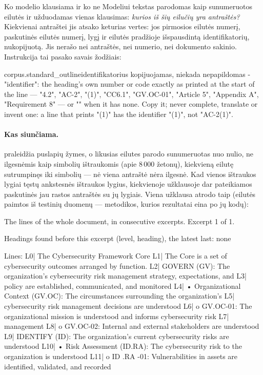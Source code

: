 \begin{aibox}{Ko modelio klausiama ir ko ne}
Modeliui tekstas parodomas kaip sunumeruotos eilutės ir užduodamas vienas klausimas:
\emph{kurios iš šių eilučių yra antraštės?} Kiekvienai antraštei jis atsako keturias vertes:
jos pirmosios eilutės numerį, paskutinės eilutės numerį, lygį ir eilutės pradžioje
išspausdintą identifikatorių, nukopijuotą. Jis nerašo nei antraštės, nei numerio, nei dokumento
sakinio. Instrukcija tai pasako savais žodžiais:
\begin{promptexcerpt}{corpus.standard_outline}{identifikatorius kopijuojamas, niekada nepapildomas}
- "identifier": the heading's own number or code exactly as printed at the
  start of the line — "4.2", "AC-2", "(1)", "CC6.1", "GV.OC-01", "Article 5",
  "Appendix A", "Requirement 8" — or "" when it has none. Copy it; never
  complete, translate or invent one: a line that prints "(1)" has the
  identifier "(1)", not "AC-2(1)".
\end{promptexcerpt}
\end{aibox}

\paragraph{Kas siunčiama.}  praleidžia puslapių žymes, o likusias eilutes
parodo sunumeruotas nuo nulio, ne ilgesnėmis kaip  simbolių
ištraukomis (apie 8\,000 žetonų), kiekvieną eilutę sutrumpinęs iki 
simbolių --- nė viena antraštė nėra ilgesnė. Kad vienos ištraukos lygiai tęstų ankstesnės
ištraukos lygius, kiekvienoje užklausoje dar pateikiamos paskutinės 
jau rastos antraštės su jų lygiais. Viena užklausa atrodo taip (eilutės paimtos iš
 testinių duomenų --- metodikos, kurios rezultatai eina po
jų kodų):

\begin{codeblock}
The lines of the whole document, in consecutive excerpts. Excerpt 1 of 1.

Headings found before this excerpt (level, heading), the latest last:
none

Lines:
L0| The Cybersecurity Framework Core
L1| The Core is a set of cybersecurity outcomes arranged by function.
L2| GOVERN (GV): The organization’s cybersecurity risk management strategy, expectations, and
L3| policy are established, communicated, and monitored
L4| • Organizational Context (GV.OC): The circumstances surrounding the organization’s
L5| cybersecurity risk management decisions are understood
L6| o GV.OC-01: The organizational mission is understood and informs cybersecurity risk
L7| management
L8| o GV.OC-02: Internal and external stakeholders are understood
L9| IDENTIFY (ID): The organization’s current cybersecurity risks are understood
L10| • Risk Assessment (ID.RA): The cybersecurity risk to the organization is understood
L11| o ID .RA -01: Vulnerabilities in assets are identified, validated, and recorded
\end{codeblock}

